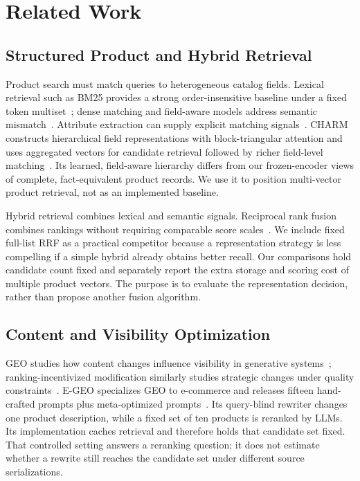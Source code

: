\section{Related Work}
\subsection{Structured Product and Hybrid Retrieval}
Product search must match queries to heterogeneous catalog fields. Lexical retrieval such as BM25 provides a strong order-insensitive baseline under a fixed token multiset~\cite{robertson2009bm25}; dense matching and field-aware models address semantic mismatch~\cite{choi2020semantic}. Attribute extraction can supply explicit matching signals~\cite{loughnane2024attributes}. CHARM constructs hierarchical field representations with block-triangular attention and uses aggregated vectors for candidate retrieval followed by richer field-level matching~\cite{freymuth2025charm}. Its learned, field-aware hierarchy differs from our frozen-encoder views of complete, fact-equivalent product records. We use it to position multi-vector product retrieval, not as an implemented baseline.

Hybrid retrieval combines lexical and semantic signals. Reciprocal rank fusion combines rankings without requiring comparable score scales~\cite{cormack2009rrf}. We include fixed full-list RRF as a practical competitor because a representation strategy is less compelling if a simple hybrid already obtains better recall. Our comparisons hold candidate count fixed and separately report the extra storage and scoring cost of multiple product vectors. The purpose is to evaluate the representation decision, rather than propose another fusion algorithm.

\subsection{Content and Visibility Optimization}
GEO studies how content changes influence visibility in generative systems~\cite{aggarwal2024geo}; ranking-incentivized modification similarly studies strategic changes under quality constraints~\cite{goren2020ranking}. E-GEO specializes GEO to e-commerce and releases fifteen hand-crafted prompts plus meta-optimized prompts~\cite{bagga2025egeo}. Its query-blind rewriter changes one product description, while a fixed set of ten products is reranked by LLMs. Its implementation caches retrieval and therefore holds that candidate set fixed. That controlled setting answers a reranking question; it does not estimate whether a rewrite still reaches the candidate set under different source serializations.

